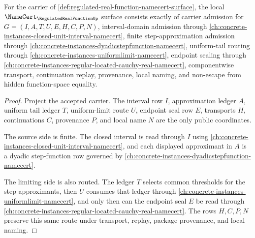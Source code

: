 \begin{theorem}
\label{thm:regulated-real-function-namecert-obligations}
For the carrier of \autoref{def:regulated-real-function-namecert-surface}, the local $\NameCert_{\RegulatedRealFunctionUp}$ surface consists exactly of carrier admission for $G=(I,A,T,U,E,H,C,P,N)$, interval-domain admission through \autoref{ch:concrete-instances-closed-unit-interval-namecert}, finite step-approximation admission through \autoref{ch:concrete-instances-dyadicstepfunction-namecert}, uniform-tail routing through \autoref{ch:concrete-instances-uniformlimit-namecert}, endpoint sealing through \autoref{ch:concrete-instances-regular-located-cauchy-real-namecert}, componentwise transport, continuation replay, provenance, local naming, and non-escape from hidden function-space equality.
\end{theorem}
\begin{proof}
Project the accepted carrier. The interval row $I$, approximation ledger $A$, uniform tail ledger $T$, uniform-limit route $U$, endpoint seal row $E$, transports $H$, continuations $C$, provenance $P$, and local name $N$ are the only public coordinates.

The source side is finite. The closed interval is read through $I$ using \autoref{ch:concrete-instances-closed-unit-interval-namecert}, and each displayed approximant in $A$ is a dyadic step-function row governed by \autoref{ch:concrete-instances-dyadicstepfunction-namecert}.

The limiting side is also routed. The ledger $T$ selects common thresholds for the step approximants, then $U$ consumes that ledger through \autoref{ch:concrete-instances-uniformlimit-namecert}, and only then can the endpoint seal $E$ be read through \autoref{ch:concrete-instances-regular-located-cauchy-real-namecert}. The rows $H,C,P,N$ preserve this same route under transport, replay, package provenance, and local naming.
\end{proof}

